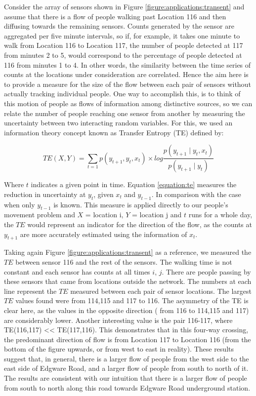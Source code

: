 Consider the array of sensors shown in Figure \ref{figure:applications:transent} and assume that there is a flow of people walking past Location 116 and then diffusing towards the remaining sensors. 
Counts generated by the sensor are aggregated per five minute intervals, so if, for example, it takes one minute to walk from Location 116 to Location 117, the number of people detected at 117 from minutes 2 to 5, would correspond to the percentage of people detected at 116 from minutes 1 to 4. 
In other words, the similarity between the time series of counts at the locations under consideration are correlated. 
Hence the aim here is to provide a measure for the size of the flow between each pair of sensors without actually tracking individual people. 
One way to accomplish this, is to think of this motion of people as flows of information among distinctive sources, so we can relate the number of people reaching one sensor from another by measuring the uncertainty between two interacting random variables. 
For this, we used an information theory concept known as Transfer Entropy (TE) defined by:

\begin{equation} \label{equation:te}
  TE(X,Y) = \sum_{t=1} p(y_{t+1}, y_{t}, x_{t}) \times { log{ \frac{p(y_{t+1} \mid y_{t}, x_{t})}{p(y_{t+1} \mid y_{t})}} }
\end{equation}

Where $t$ indicates a given point in time.
Equation \ref{equation:te} measures the reduction in uncertainty at $y_{t}$, given $x_{t}$ and $y_{t-1}$.
In comparison with the case when only $y_{t-1}$ is known.
This measure is applied directly to our people's movement problem and $X$ = location i, $Y$ = location j and $t$ runs for a whole day, the $TE$ would represent an indicator for the direction of the flow, as the counts at $y_{t+1}$ are more accurately estimated using the information of $x_{t}$.

Taking again Figure \ref{figure:applications:transent} as a reference, we measured the $TE$ between sensor 116 and the rest of the sensors.
The walking time is not constant and each sensor has counts at all times $i$, $j$.
There are people passing by these sensors that came from locations outside the network.
The numbers at each line represent the $TE$ measured between each pair of sensor locations.
The largest $TE$ values found were from 114,115 and 117 to 116.
The asymmetry of the TE is clear here, as the values in the opposite direction ( from 116 to 114,115 and 117) are considerably lower.
Another interesting value is the pair 116-117, where TE(116,117) << TE(117,116).
This demonstrates that in this four-way crossing, the predominant direction of flow is from Location 117 to Location 116 (from the bottom of the figure upwards, or from west to east in reality). 
These results suggest that, in general, there is a larger flow of people from the west side to the east side of Edgware Road, and a larger flow of people from south to north of it. 
The results are consistent with our intuition that there is a larger flow of people from south to north along this road towards Edgware Road underground station.

